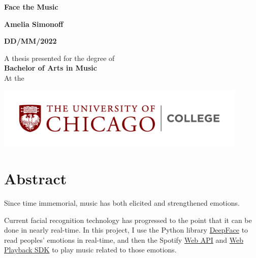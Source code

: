 \documentclass{article}
\title{}
\author{Amelia Simonoff}
\date{MONTH DD 2022}
\renewcommand{\_}[1]{\underline{ #1 }}
\theoremstyle{definition}
\begin{document}
\begin{titlepage}
    \begin{center}
        \vspace*{1cm}
            
        \Huge
        \textbf{Face the Music}
            
        \vspace{0.5cm}
        \LARGE
            
        \vspace{1.5cm}
            
        \textbf{Amelia Simonoff}
        
        \textbf{DD/MM/2022}
            
        \vfill
            
        A thesis presented for the degree of\\
        \textbf{Bachelor of Arts in Music} \\
        At the
        
        \vspace{0.8cm}
            
        \includegraphics[width=0.9\textwidth]{UChicago_College_Horizontal_Color_RGB.png}

        \Large
            
    \end{center}
\end{titlepage}

\section{Abstract}

Since time immemorial, music has both elicited and strengthened emotions. 

Current facial recognition technology has progressed to the point that it can be done in nearly real-time. In this project, I use the Python library \href{https://pypi.org/project/deepface/}{DeepFace} to read peoples' emotions in real-time, and then the Spotify \href{https://developer.spotify.com/documentation/web-api/reference/}{Web API} and \href{https://developer.spotify.com/documentation/web-playback-sdk/reference/}{Web Playback SDK} to play music related to those emotions.
\end{document}
